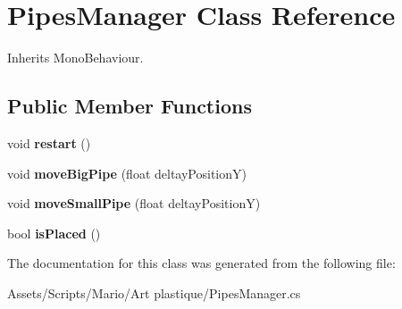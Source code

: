 \hypertarget{class_pipes_manager}{\section{Pipes\-Manager Class Reference}
\label{class_pipes_manager}
}


Inherits Mono\-Behaviour.

\subsection*{Public Member Functions}
\begin{DoxyCompactItemize}
\item 
\hypertarget{class_pipes_manager_a34e066d344171e017dff3fb67e6b7a49}{void {\bfseries restart} ()}\label{class_pipes_manager_a34e066d344171e017dff3fb67e6b7a49}

\item 
\hypertarget{class_pipes_manager_ab143afaaa5ce7252a662a6f3ddddacf8}{void {\bfseries move\-Big\-Pipe} (float deltay\-Position\-Y)}\label{class_pipes_manager_ab143afaaa5ce7252a662a6f3ddddacf8}

\item 
\hypertarget{class_pipes_manager_ac63d270c7e29bc38fdce9d70a94d255a}{void {\bfseries move\-Small\-Pipe} (float deltay\-Position\-Y)}\label{class_pipes_manager_ac63d270c7e29bc38fdce9d70a94d255a}

\item 
\hypertarget{class_pipes_manager_a03914d77da3d4a27302e45534b7b99e2}{bool {\bfseries is\-Placed} ()}\label{class_pipes_manager_a03914d77da3d4a27302e45534b7b99e2}

\end{DoxyCompactItemize}


The documentation for this class was generated from the following file\-:\begin{DoxyCompactItemize}
\item 
Assets/\-Scripts/\-Mario/\-Art plastique/Pipes\-Manager.\-cs\end{DoxyCompactItemize}
